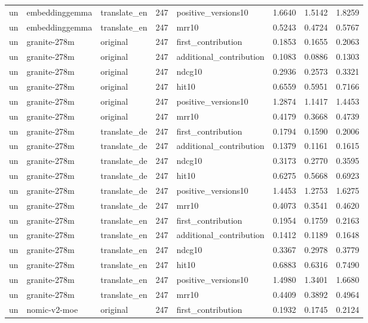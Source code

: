 \begin{tabular}{lllrlrrr}
un & embeddinggemma & translate\_en & 247 & positive\_versions10 & 1.6640 & 1.5142 & 1.8259 \\
un & embeddinggemma & translate\_en & 247 & mrr10 & 0.5243 & 0.4724 & 0.5767 \\
un & granite-278m & original & 247 & first\_contribution & 0.1853 & 0.1655 & 0.2063 \\
un & granite-278m & original & 247 & additional\_contribution & 0.1083 & 0.0886 & 0.1303 \\
un & granite-278m & original & 247 & ndcg10 & 0.2936 & 0.2573 & 0.3321 \\
un & granite-278m & original & 247 & hit10 & 0.6559 & 0.5951 & 0.7166 \\
un & granite-278m & original & 247 & positive\_versions10 & 1.2874 & 1.1417 & 1.4453 \\
un & granite-278m & original & 247 & mrr10 & 0.4179 & 0.3668 & 0.4739 \\
un & granite-278m & translate\_de & 247 & first\_contribution & 0.1794 & 0.1590 & 0.2006 \\
un & granite-278m & translate\_de & 247 & additional\_contribution & 0.1379 & 0.1161 & 0.1615 \\
un & granite-278m & translate\_de & 247 & ndcg10 & 0.3173 & 0.2770 & 0.3595 \\
un & granite-278m & translate\_de & 247 & hit10 & 0.6275 & 0.5668 & 0.6923 \\
un & granite-278m & translate\_de & 247 & positive\_versions10 & 1.4453 & 1.2753 & 1.6275 \\
un & granite-278m & translate\_de & 247 & mrr10 & 0.4073 & 0.3541 & 0.4620 \\
un & granite-278m & translate\_en & 247 & first\_contribution & 0.1954 & 0.1759 & 0.2163 \\
un & granite-278m & translate\_en & 247 & additional\_contribution & 0.1412 & 0.1189 & 0.1648 \\
un & granite-278m & translate\_en & 247 & ndcg10 & 0.3367 & 0.2978 & 0.3779 \\
un & granite-278m & translate\_en & 247 & hit10 & 0.6883 & 0.6316 & 0.7490 \\
un & granite-278m & translate\_en & 247 & positive\_versions10 & 1.4980 & 1.3401 & 1.6680 \\
un & granite-278m & translate\_en & 247 & mrr10 & 0.4409 & 0.3892 & 0.4964 \\
un & nomic-v2-moe & original & 247 & first\_contribution & 0.1932 & 0.1745 & 0.2124 \\

\end{tabular}
